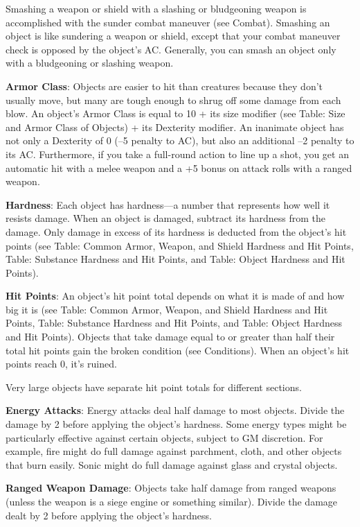 			
Smashing a weapon or shield with a slashing or bludgeoning weapon is accomplished with the sunder combat maneuver (see Combat). Smashing an object is like sundering a weapon or shield, except that your combat maneuver check is opposed by the object's AC. Generally, you can smash an object only with a bludgeoning or slashing weapon.
			
\textbf{Armor Class}: Objects are easier to hit than creatures because they don't usually move, but many are tough enough to shrug off some damage from each blow. An object's Armor Class is equal to 10 + its size modifier (see Table: Size and Armor Class of Objects) + its Dexterity modifier. An inanimate object has not only a Dexterity of 0 (--5 penalty to AC), but also an additional --2 penalty to its AC. Furthermore, if you take a full-round action to line up a shot, you get an automatic hit with a melee weapon and a +5 bonus on attack rolls with a ranged weapon.
			
\textbf{Hardness}: Each object has hardness---a number that represents how well it resists damage. When an object is damaged, subtract its hardness from the damage. Only damage in excess of its hardness is deducted from the object's hit points (see Table: Common Armor, Weapon, and Shield Hardness and Hit Points, Table: Substance Hardness and Hit Points, and Table: Object Hardness and Hit Points).
			
\textbf{Hit Points}: An object's hit point total depends on what it is made of and how big it is (see Table: Common Armor, Weapon, and Shield Hardness and Hit Points, Table: Substance Hardness and Hit Points, and Table: Object Hardness and Hit Points). Objects that take damage equal to or greater than half their total hit points gain the broken condition (see Conditions). When an object's hit points reach 0, it's ruined.
			
Very large objects have separate hit point totals for different sections.
			
\textbf{Energy Attacks}: Energy attacks deal half damage to most objects. Divide the damage by 2 before applying the object's hardness. Some energy types might be particularly effective against certain objects, subject to GM discretion. For example, fire might do full damage against parchment, cloth, and other objects that burn easily. Sonic might do full damage against glass and crystal objects.
			
\textbf{Ranged Weapon Damage}: Objects take half damage from ranged weapons (unless the weapon is a siege engine or something similar). Divide the damage dealt by 2 before applying the object's hardness.
			

